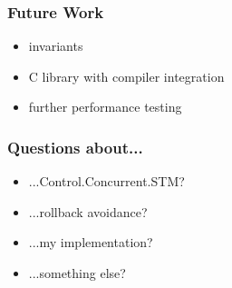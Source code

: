 \documentclass{beamer}
\begin{document}
\begin{frame}
 \frametitle{Future Work}
 \begin{itemize}\setlength\itemsep{1em}
  \item invariants 
  \item C library with compiler integration
  \item further performance testing
 \end{itemize}
\end{frame}

 

\begin{frame}
 \frametitle{Questions about...}
 \begin{itemize}\setlength\itemsep{1em}
  \item ...Control.Concurrent.STM?
  \item ...rollback avoidance?
  \item ...my implementation?
  \item ...something else?
\end{itemize}
\end{frame}


  
\end{document}
